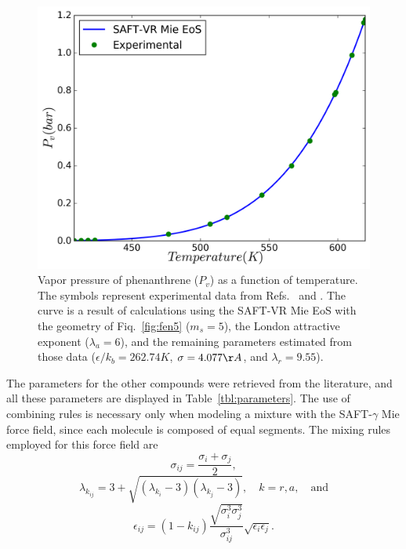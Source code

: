 \documentclass[final,12p,times,twocolumn]{elsarticle}
\begin{document}
	\begin{figure}[h]
		\includegraphics[width=0.9\columnwidth]{Figures/eos}
		\caption{Vapor pressure of phenanthrene ($P_{v}$) as a function of temperature. The symbols represent experimental data from Refs.~ and . The curve is a result of calculations using the SAFT-VR Mie EoS with the geometry of Fiq.~\ref{fig:fen5} ($m_s = 5$), the London attractive exponent ($\lambda_a = 6$), and the remaining parameters estimated from those data ($\epsilon/k_b = 262.74 K$, $\sigma = 4.077 \AA$, and $\lambda_r = 9.55$).}
		\label{fig:edefit}
	\end{figure}

	The parameters for the other compounds were retrieved from the literature, and all these parameters are displayed in Table~\ref{tbl:parameters}. The use of combining rules is necessary only when modeling a mixture with the SAFT-$\gamma$ Mie force field, since each molecule is composed of equal segments. The mixing rules employed for this force field are \cite{lafitte2013}
	\begin{equation}
	\sigma_{ij} =\frac{\sigma_i+\sigma_j}{2},
	\label{eqn:sigmamix}
	\end{equation}
	\begin{equation}
	\lambda_{k_{ij}} = 3 + \sqrt{(\lambda_{k_i}-3)(\lambda_{k_j}-3)}, \quad k=r,a, \quad \text{and}
	\label{eqn:lambdamix}
	\end{equation}
	\begin{equation}
	\label{eqn:epsmix}
	\epsilon_{ij} =(1-k_{ij})\frac{\sqrt{\sigma_i^3\sigma_j^3}}{\sigma_{ij}^3}\sqrt{\epsilon_i\epsilon_j}.
	\end{equation}
	
\end{document}
